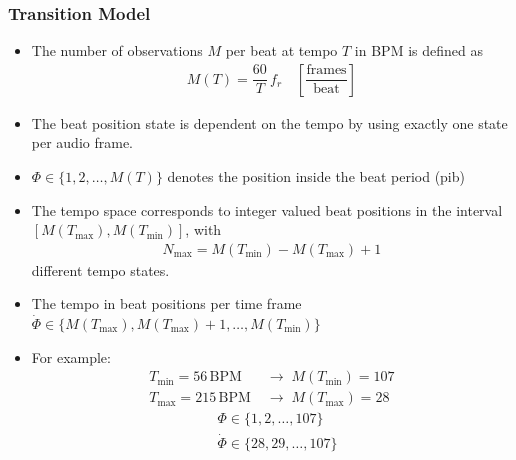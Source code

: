 \documentclass{scrartcl}
\begin{document}
\subsubsection{Transition Model}
\begin{itemize}
\item The number of observations $M$ per beat at tempo $T$ in BPM is defined as 
\begin{align}
M(T) = \dfrac{60}{T} \,f_r \quad \left[ \dfrac{\text{frames}}{\text{beat}}\right]
\end{align} 
\item The beat position state is dependent on the tempo by using exactly one  state per audio frame.


\item $\Phi \in \{1,2,\dots, M(T)\}$ denotes the position inside the beat period (pib)
\item The tempo space corresponds to integer valued beat positions in the interval $[M(T_{\text{max}}), M(T_{\text{min}})]$, with 
\begin{align}
N_{\text{max}} = M(T_{\text{min}}) - M(T_{\text{max}}) + 1
\end{align} 
different tempo states.

\item The tempo in beat positions per time frame $\dot \Phi \in \{M(T_{\text{max}}), M(T_{\text{max}}) + 1,  \dots, M(T_{\text{min}})\}$ 
\item For example: 
\begin{align*}
T_{\text{min}} = 56 \,\text{BPM} & \;\rightarrow \; M(T_{\text{min}}) = 107 \\
T_{\text{max}} = 215 \,\text{BPM} &\;\rightarrow \; M(T_{\text{max}}) = 28 
\end{align*} 
\vspace{-1.5em}
\begin{align*}
&\Phi \in \{1, 2, \dots ,107\} \\
&\dot \Phi \in \{28, 29, \dots ,107\}
\end{align*} 



\end{itemize}
\end{document}
